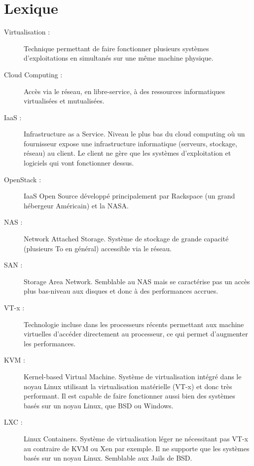 \documentclass{report}
\begin{document}
\section{Lexique}
\begin{description}
\item[Virtualisation :] Technique permettant de faire fonctionner plusieurs systèmes d'exploitations en simultanés sur une même machine physique.

\item[Cloud Computing :] Accès via le réseau, en libre-service, à des ressources informatiques virtualisées et mutualisées.

\item[IaaS :] Infrastructure as a Service. Niveau le plus bas du cloud computing où un fournisseur expose une infrastructure informatique (serveurs, stockage, réseau) au client. Le client ne gère que les systèmes d'exploitation et logiciels qui vont fonctionner dessus.

\item[OpenStack :] IaaS Open Source développé principalement par Rackspace (un grand hébergeur Américain) et la NASA.

\item[NAS :] Network Attached Storage. Système de stockage de grande capacité (plusieurs To en général) accessible via le réseau.

\item[SAN :] Storage Area Network. Semblable au NAS mais se caractérise pas un accès plus bas-niveau aux disques et donc à des performances accrues.

\item[VT-x :] Technologie incluse dans les processeurs récents permettant aux machine virtuelles d'accéder directement au processeur, ce qui permet d'augmenter les performances.

\item[KVM :] Kernel-based Virtual Machine. Système de virtualisation intégré dans le noyau Linux utilisant la virtualisation matérielle (VT-x) et donc très performant. Il est capable de faire fonctionner aussi bien des systèmes basés sur un noyau Linux, que BSD ou Windows.

\item[LXC :] Linux Containers. Système de virtualisation léger ne nécessitant pas VT-x au contraire de KVM ou Xen par exemple. Il ne supporte que les systèmes basés sur un noyau Linux. Semblable aux Jails de BSD.
\end{description}
 
\end{document}

